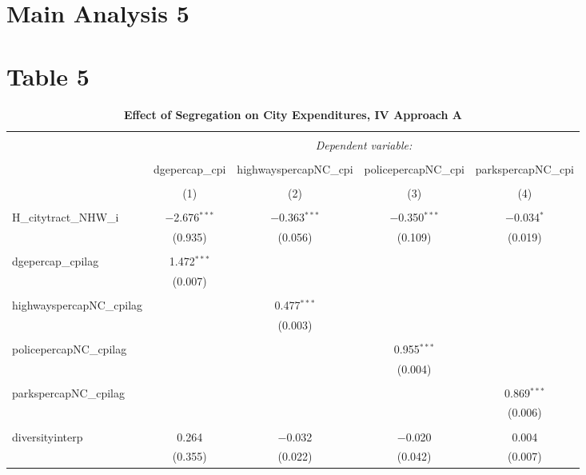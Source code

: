 \documentclass[]{article}
\begin{document}
\hypertarget{main-analysis-5}{%
\section{Main Analysis 5}\label{main-analysis-5}}

\hypertarget{table-5}{%
\section{Table 5}\label{table-5}}

\begin{table}[!htbp] \centering 
  \caption{\textbf{Effect of Segregation on City Expenditures, IV Approach A}} 
  \label{} 
\begin{tabular}{@{\extracolsep{5pt}}lcccc} 
\\[-1.8ex]\hline 
\hline \\[-1.8ex] 
 & \multicolumn{4}{c}{\textit{Dependent variable:}} \\ 
\cline{2-5} 
\\[-1.8ex] & dgepercap\_cpi & highwayspercapNC\_cpi & policepercapNC\_cpi & parkspercapNC\_cpi \\ 
\\[-1.8ex] & (1) & (2) & (3) & (4)\\ 
\hline \\[-1.8ex] 
 H\_citytract\_NHW\_i & $-$2.676$^{***}$ & $-$0.363$^{***}$ & $-$0.350$^{***}$ & $-$0.034$^{*}$ \\ 
  & (0.935) & (0.056) & (0.109) & (0.019) \\ 
  & & & & \\ 
 dgepercap\_cpilag & 1.472$^{***}$ &  &  &  \\ 
  & (0.007) &  &  &  \\ 
  & & & & \\ 
 highwayspercapNC\_cpilag &  & 0.477$^{***}$ &  &  \\ 
  &  & (0.003) &  &  \\ 
  & & & & \\ 
 policepercapNC\_cpilag &  &  & 0.955$^{***}$ &  \\ 
  &  &  & (0.004) &  \\ 
  & & & & \\ 
 parkspercapNC\_cpilag &  &  &  & 0.869$^{***}$ \\ 
  &  &  &  & (0.006) \\ 
  & & & & \\ 
 diversityinterp & 0.264 & $-$0.032 & $-$0.020 & 0.004 \\ 
  & (0.355) & (0.022) & (0.042) & (0.007) \\ 

\end{tabular}
\end{table}
\end{document}

